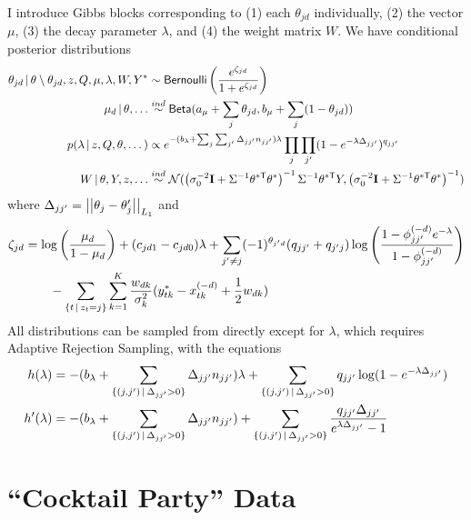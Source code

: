 I introduce Gibbs blocks corresponding to (1) each $\theta_{jd}$
individually, (2) the vector $\mu$, (3) the decay parameter
$\lambda$, and (4) the weight matrix $W$.
We have conditional posterior distributions
\begin{align}
  \label{eq:101}
  \theta_{jd} \, \vert \, \theta \setminus \theta_{jd}, z, Q, \mu,
  \lambda, W, Y^* &\sim
  \mathsf{Bernoulli}\left(\frac{e^{\zeta_{jd}}}{1 + e^{\zeta_{jd}}}\right) \\
  \mu_d \, \vert \, \theta, \dots &\stackrel{ind}{\sim} \mathsf{Beta}(a_\mu + \sum_{j} \theta_{jd},b_\mu +
  \sum_{j} (1 - \theta_{jd})) \\
p(\lambda \, \vert \, z, Q, \theta, \dots) &\propto e^{-(b_{\lambda} + \sum_{j}\sum_{j'} \Delta_{jj'} n_{jj'})\lambda} \prod_{j}\prod_{j'}
  (1-e^{-\lambda\Delta_{jj'}})^{q_{jj'}} \\
  W \, \vert \, \theta, Y, z, \dots &\stackrel{ind}{\sim} \mathcal{N}(\left(\sigma_0^{-2} \mathbf{I} + \Sigma^{-1} \theta^{*\mathsf{T}} \theta^*
    \right)^{-1}\Sigma^{-1} \theta^{*\mathsf{T}} Y,\left(\sigma_0^{-2} \mathbf{I} + \Sigma^{-1} \theta^{*\mathsf{T}} \theta^{*}\right)^{-1})
\end{align}
where $\Delta_{jj'} = \left\vert \left \vert \theta_j - \theta_j' \right\vert \right\vert_{L_1}$ and
\begin{align}
\zeta_{jd} &= \log\left(\frac{\mu_d}{1 - \mu_d}\right)
  + (c_{jd1} - c_{jd0}) \lambda +
    \sum_{j' \neq j}
  (-1)^{\theta_{j'd}}(q_{jj'} + q_{j'j})\log\left(\frac{1 -
      \phi_{jj'}^{(-d)}e^{-\lambda}}{1-\phi_{jj'}^{(-d)}}\right)
  \notag \\ & \qquad - \sum_{\{t \, \vert \, z_t = j\}} \sum_{k=1}^K
  \frac{w_{dk}}{\sigma^2_k}(y^*_{tk} - x_{tk}^{(-d)} + \frac{1}{2}w_{dk})
\end{align}
All distributions can be sampled from directly except for $\lambda$, which
requires Adaptive Rejection Sampling, with the equations
\begin{align}
  h(\lambda) &= 
  -(b_{\lambda} + \sum_{\{(j,j') \, \vert \, \Delta_{jj'} > 0\}} \Delta_{jj'} n_{jj'})\lambda +
  \sum_{\{(j,j') \, \vert \, \Delta_{jj'} > 0\}} q_{jj'} \log(1 - e^{-\lambda\Delta_{jj'}}) \\
  h'(\lambda) &= -(b_{\lambda} + \sum_{\{(j,j') \, \vert \, \Delta_{jj'} > 0\}} \Delta_{jj'}
  n_{jj'}) + \sum_{\{(j,j') \, \vert \, \Delta_{jj'} > 0\}}
  \frac{q_{jj'}\Delta_{jj'}}{e^{\lambda\Delta_{jj'}} - 1}
\end{align}


\section{``Cocktail Party'' Data}


